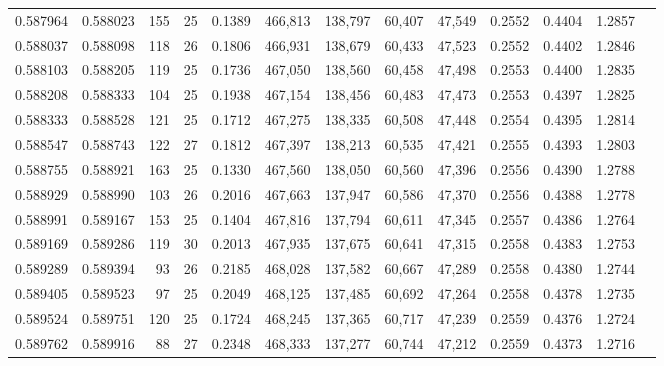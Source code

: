 \begin{tabular}{rrrrrrrrrrrrr}
0.587964 & 0.588023 &    155 &    25 &                                     0.1389 & 466,813 & 138,797 &  60,407 &  47,549 & 0.2552 & 0.4404 & 1.2857 \\
0.588037 & 0.588098 &    118 &    26 &                                     0.1806 & 466,931 & 138,679 &  60,433 &  47,523 & 0.2552 & 0.4402 & 1.2846 \\
0.588103 & 0.588205 &    119 &    25 &                                     0.1736 & 467,050 & 138,560 &  60,458 &  47,498 & 0.2553 & 0.4400 & 1.2835 \\
0.588208 & 0.588333 &    104 &    25 &                                     0.1938 & 467,154 & 138,456 &  60,483 &  47,473 & 0.2553 & 0.4397 & 1.2825 \\
0.588333 & 0.588528 &    121 &    25 &                                     0.1712 & 467,275 & 138,335 &  60,508 &  47,448 & 0.2554 & 0.4395 & 1.2814 \\
0.588547 & 0.588743 &    122 &    27 &                                     0.1812 & 467,397 & 138,213 &  60,535 &  47,421 & 0.2555 & 0.4393 & 1.2803 \\
0.588755 & 0.588921 &    163 &    25 &                                     0.1330 & 467,560 & 138,050 &  60,560 &  47,396 & 0.2556 & 0.4390 & 1.2788 \\
0.588929 & 0.588990 &    103 &    26 &                                     0.2016 & 467,663 & 137,947 &  60,586 &  47,370 & 0.2556 & 0.4388 & 1.2778 \\
0.588991 & 0.589167 &    153 &    25 &                                     0.1404 & 467,816 & 137,794 &  60,611 &  47,345 & 0.2557 & 0.4386 & 1.2764 \\
0.589169 & 0.589286 &    119 &    30 &                                     0.2013 & 467,935 & 137,675 &  60,641 &  47,315 & 0.2558 & 0.4383 & 1.2753 \\
0.589289 & 0.589394 &     93 &    26 &                                     0.2185 & 468,028 & 137,582 &  60,667 &  47,289 & 0.2558 & 0.4380 & 1.2744 \\
0.589405 & 0.589523 &     97 &    25 &                                     0.2049 & 468,125 & 137,485 &  60,692 &  47,264 & 0.2558 & 0.4378 & 1.2735 \\
0.589524 & 0.589751 &    120 &    25 &                                     0.1724 & 468,245 & 137,365 &  60,717 &  47,239 & 0.2559 & 0.4376 & 1.2724 \\
0.589762 & 0.589916 &     88 &    27 &                                     0.2348 & 468,333 & 137,277 &  60,744 &  47,212 & 0.2559 & 0.4373 & 1.2716 \\

\end{tabular}
